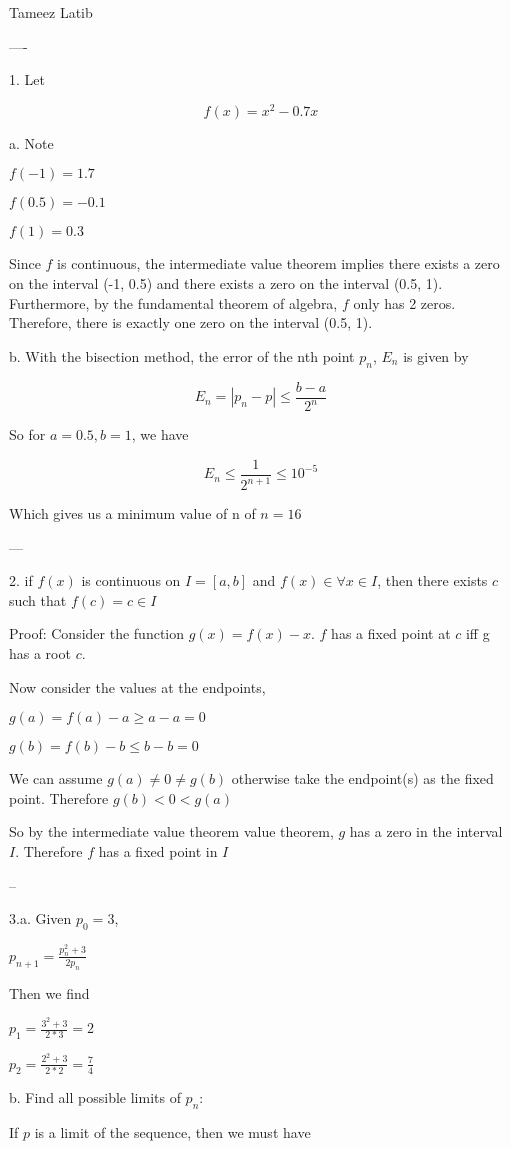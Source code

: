 \documentclass{article}
\begin{document}
Tameez Latib


----

1. Let 

$$f(x) = x^2 - 0.7x$$

a. Note 

$f(-1) = 1.7$

$f(0.5) = -0.1$

$f(1) = 0.3$

Since $f$ is continuous, the intermediate value theorem implies there exists a zero on the interval (-1, 0.5) and there exists a zero on the interval (0.5, 1). Furthermore, by the fundamental theorem of algebra, $f$ only has 2 zeros. Therefore, there is exactly one zero on the interval (0.5, 1).


b. With the bisection method, the error of the nth point $p_n$, $E_n$ is given by 

$$E_n = |p_n - p| \le \frac{b-a}{2^n} $$

So for $a = 0.5, b = 1$, we have 

$$E_n \le \frac{1}{2^{n+1}} \le 10^{-5} $$

Which gives us a minimum value of n of $n = 16$

---

2. if $f(x)$ is continuous on $I = [a, b]$ and $f(x) \in \forall x \in I$, then there exists $c$ such that $f(c) = c \in I$

Proof:  Consider the function $g(x) = f(x) - x$. $f$ has a fixed point at $c$ iff g has a root $c$.

Now consider the values at the endpoints,

$g(a) = f(a) - a \ge a - a = 0$ 

$g(b) = f(b) - b \le b - b = 0$

We can assume $g(a) \ne 0 \ne g(b)$ otherwise take the endpoint(s) as the fixed point. Therefore $g(b) < 0 < g(a)$ 

So by the intermediate value theorem value theorem, $g$ has a zero in the interval $I$. Therefore $f$ has a fixed point in $I$

--

3.a. Given $p_0 = 3$, 

$p_{n+1} = \frac{p_n^2+3}{2p_n}$

Then we find 

$p_1 =\frac{3^2+3}{2*3} = 2$

$p_2 =\frac{2^2+3}{2*2} = \frac{7}{4}$ 

b. Find all possible limits of $p_n$:

If $p$ is a limit of the sequence, then we must have 
\end{document}
